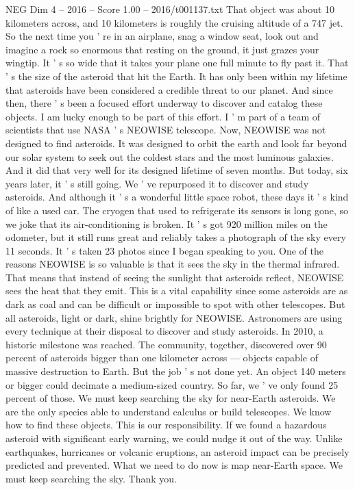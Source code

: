 \begin{textsample}{NEG Dim 4 – 2016 – Score 1.00 – 2016/t001137.txt}
That object was about 10 kilometers across, and 10 kilometers is roughly the cruising altitude of a 747 jet.
So the next time you ' re in an airplane, snag a window seat, look out and imagine a rock so enormous that resting on the ground, it just grazes your wingtip.
It ' s so wide that it takes your plane one full minute to fly past it.
That ' s the size of the asteroid that hit the Earth.
It has only been within my lifetime that asteroids have been considered a credible threat to our planet.
And since then, there ' s been a focused effort underway to discover and catalog these objects.
I am lucky enough to be part of this effort.
I ' m part of a team of scientists that use NASA ' s NEOWISE telescope.
Now, NEOWISE was not designed to find asteroids.
It was designed to orbit the earth and look far beyond our solar system to seek out the coldest stars and the most luminous galaxies.
And it did that very well for its designed lifetime of seven months.
But today, six years later, it ' s still going.
We ' ve repurposed it to discover and study asteroids.
And although it ' s a wonderful little space robot, these days it ' s kind of like a used car.
The cryogen that used to refrigerate its sensors is long gone, so we joke that its air-conditioning is broken.
It ' s got 920 million miles on the odometer, but it still runs great and reliably takes a photograph of the sky every 11 seconds.
It ' s taken 23 photos since I began speaking to you.
One of the reasons NEOWISE is so valuable is that it sees the sky in the thermal infrared.
That means that instead of seeing the sunlight that asteroids reflect, NEOWISE sees the heat that they emit.
This is a vital capability since some asteroids are as dark as coal and can be difficult or impossible to spot with other telescopes.
But all asteroids, light or dark, shine brightly for NEOWISE.
Astronomers are using every technique at their disposal to discover and study asteroids.
In 2010, a historic milestone was reached.
The community, together, discovered over 90 percent of asteroids bigger than one kilometer across — objects capable of massive destruction to Earth.
But the job ' s not done yet.
An object 140 meters or bigger could decimate a medium-sized country.
So far, we ' ve only found 25 percent of those.
We must keep searching the sky for near-Earth asteroids.
We are the only species able to understand calculus or build telescopes.
We know how to find these objects.
This is our responsibility.
If we found a hazardous asteroid with significant early warning, we could nudge it out of the way.
Unlike earthquakes, hurricanes or volcanic eruptions, an asteroid impact can be precisely predicted and prevented.
What we need to do now is map near-Earth space.
We must keep searching the sky.
Thank you.

\end{textsample}
